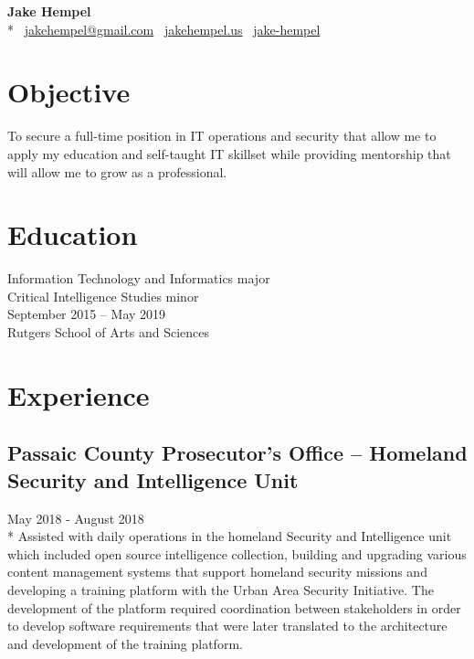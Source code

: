 \documentclass{article}
\begin{document}
\begin{samepage}
\begin{center}
\huge{\textbf{Jake Hempel}} \\*
\large{\faEnvelope \, \href{mailto:jakehempel@gmail.com}{jakehempel@gmail.com} 
\faGlobe \, \href{https://jakehempel.us}{jakehempel.us}}  
\faLinkedinSquare \, \href{https://www.linkedin.com/in/jake-hempel/}{jake-hempel}
\end{center}
 \begin{multicols}{2}

\section{Objective}
To secure a full-time position in IT operations and security that allow me to apply my education and self-taught IT skillset while providing mentorship that will allow me to grow as a professional.

 \columnbreak

\section{Education}
Information Technology and Informatics major\\
Critical Intelligence Studies minor\\
September 2015 -- May 2019\\
Rutgers School of Arts and Sciences

 \end{multicols}

\section{Experience}

\subsection{Passaic County Prosecutor's Office -- Homeland Security and Intelligence Unit}
May 2018 - August 2018\\*
Assisted with daily operations in the homeland Security and Intelligence unit which included open source intelligence collection, building and upgrading various content management systems that support homeland security missions and developing a training platform with the Urban Area Security Initiative.  The development of the platform required coordination between stakeholders in order to develop software requirements that were later translated to the architecture and development of the training platform.


\end{samepage}
\end{document}
